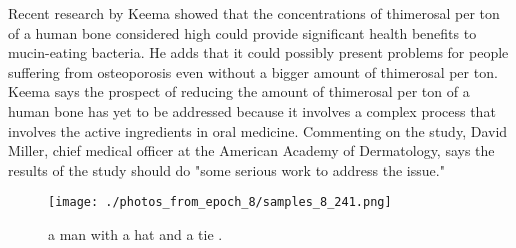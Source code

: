 \documentclass{article}%
\begin{document}
Recent research by Keema showed that the concentrations of thimerosal per ton of a human bone considered high could provide significant health benefits to mucin{-}eating bacteria. He adds that it could possibly present problems for people suffering from osteoporosis even without a bigger amount of thimerosal per ton.\newline%
Keema says the prospect of reducing the amount of thimerosal per ton of a human bone has yet to be addressed because it involves a complex process that involves the active ingredients in oral medicine.\newline%
Commenting on the study, David Miller, chief medical officer at the American Academy of Dermatology, says the results of the study should do "some serious work to address the issue."\newline%

%


\begin{figure}[h!]%
\centering%
\texttt{[image: ./photos\_from\_epoch\_8/samples\_8\_241.png]}%
\caption{a man with a hat and a tie .}%
\end{figure}

%
\end{document}
